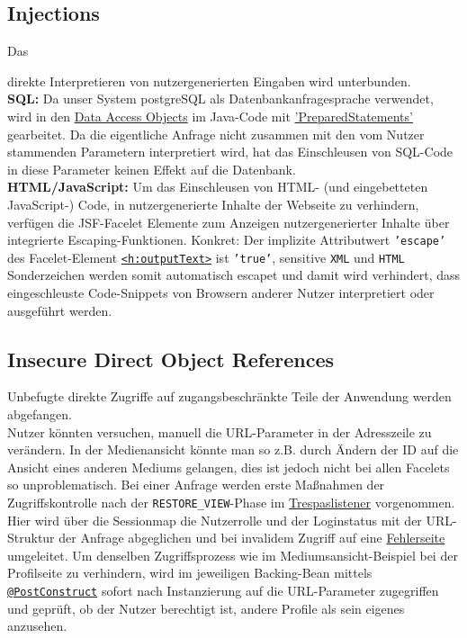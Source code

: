 \documentclass{article}
\begin{document}
\subsection{Injections}
\hypertarget{Injections}{Das} direkte Interpretieren von nutzergenerierten Eingaben wird unterbunden.\\
\textbf{SQL:} Da unser System postgreSQL als Datenbankanfragesprache verwendet, wird in den \hyperlink{DAOs}{Data Access Objects} im Java-Code mit \hyperlink{https://docs.oracle.com/javase/7/docs/api/java/sql/PreparedStatement.html}{'PreparedStatements'} gearbeitet. Da die eigentliche Anfrage nicht zusammen mit den vom Nutzer stammenden Parametern interpretiert wird, hat das Einschleusen von SQL-Code in diese Parameter keinen Effekt auf die Datenbank.\\
\textbf{HTML/JavaScript:} \hypertarget{XSS}{Um} das Einschleusen von HTML- (und eingebetteten JavaScript-) Code, in nutzergenerierte Inhalte der Webseite zu verhindern, verfügen die JSF-Facelet Elemente zum Anzeigen nutzergenerierter Inhalte über integrierte Escaping-Funktionen. Konkret: Der implizite Attributwert \texttt{'escape'} des Facelet-Element \hyperlink{https://docs.oracle.com/javaee/7/javaserver-faces-2-2/vdldocs-facelets/h/outputText.html}{\texttt{<h:outputText>}} ist \texttt{'true'}, sensitive \texttt{XML} und \texttt{HTML} Sonderzeichen werden somit automatisch escapet und damit wird verhindert, dass eingeschleuste Code-Snippets von Browsern anderer Nutzer interpretiert oder ausgeführt werden.
\subsection{Insecure Direct Object References}
Unbefugte direkte Zugriffe auf zugangsbeschränkte Teile der Anwendung werden abgefangen.\\ 
Nutzer könnten versuchen, manuell die URL-Parameter in der Adresszeile zu verändern. In der Medienansicht könnte man so z.B. durch Ändern der ID auf die Ansicht eines anderen Mediums gelangen, dies ist jedoch nicht bei allen Facelets so unproblematisch. Bei einer Anfrage werden erste Maßnahmen der Zugriffskontrolle nach der \texttt{RESTORE\_VIEW}-Phase im \hyperlink{PhaseListener}{Trespaslistener} vorgenommen. Hier wird über die Sessionmap die Nutzerrolle und der Loginstatus mit der URL-Struktur der Anfrage abgeglichen und bei invalidem Zugriff auf eine \hyperlink{invalidaccess}{Fehlerseite} umgeleitet. Um denselben Zugriffsprozess wie im Mediumsansicht-Beispiel bei der Profilseite zu verhindern, wird im jeweiligen Backing-Bean mittels \hyperlink{https://docs.oracle.com/javaee/7/api/javax/annotation/PostConstruct.html}{\texttt{@PostConstruct}} sofort nach Instanzierung auf die URL-Parameter zugegriffen und geprüft, ob der Nutzer berechtigt ist, andere Profile als sein eigenes anzusehen. 
\end{document}
